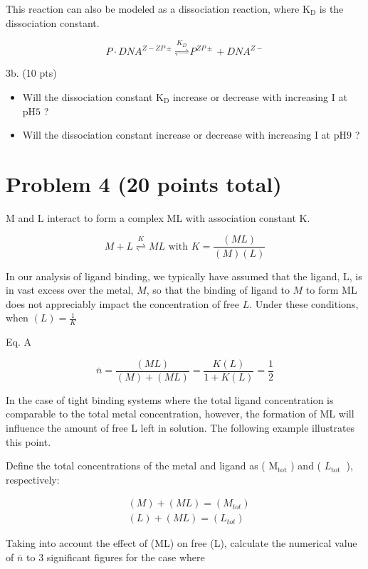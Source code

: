 \documentclass[12pt]{article}
\begin{document}
This reaction can also be modeled as a dissociation reaction, where $\mathrm{K}_{\mathrm{D}}$ is the dissociation constant.

$$
P \cdot D N A^{Z-Z P \pm} \stackrel{K_{D}}{\rightleftharpoons} P^{Z P \pm}+D N A^{Z-}
$$

3b. (10 pts)

\begin{itemize}
  \item Will the dissociation constant $\mathrm{K}_{\mathrm{D}}$ increase or decrease with increasing I at $\mathrm{pH} 5$ ?
  \item Will the dissociation constant increase or decrease with increasing I at $\mathrm{pH} 9$ ?
\end{itemize}

\section{Problem 4 (20 points total)}
$\mathrm{M}$ and $\mathrm{L}$ interact to form a complex $\mathrm{ML}$ with association constant $\mathrm{K}$.

$$
M+L \stackrel{K}{\rightleftharpoons} M L \text { with } K=\frac{(M L)}{(M)(L)}
$$

In our analysis of ligand binding, we typically have assumed that the ligand, L, is in vast excess over the metal, $M$, so that the binding of ligand to $M$ to form ML does not appreciably impact the concentration of free $L$. Under these conditions, when $(L)=\frac{1}{K}$

Eq. A

$$
\bar{n}=\frac{(M L)}{(M)+(M L)}=\frac{K(L)}{1+K(L)}=\frac{1}{2}
$$

In the case of tight binding systems where the total ligand concentration is comparable to the total metal concentration, however, the formation of ML will influence the amount of free L left in solution. The following example illustrates this point.

Define the total concentrations of the metal and ligand as ( $\mathrm{M}_{\mathrm{tot}}$ ) and ( $L_{\text {tot }}$ ), respectively:

$$
\begin{aligned}
& (M)+(M L)=\left(M_{t o t}\right) \\
& (L)+(M L)=\left(L_{t o t}\right)
\end{aligned}
$$

Taking into account the effect of (ML) on free (L), calculate the numerical value of $\bar{n}$ to 3 significant figures for the case where
\end{document}
